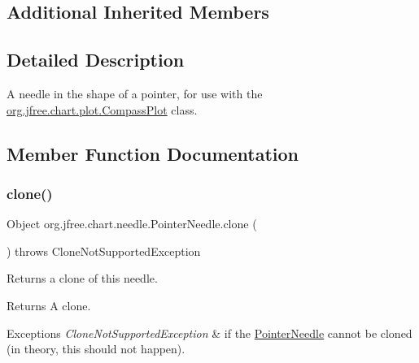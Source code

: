 \subsection*{Additional Inherited Members}


\subsection{Detailed Description}
A needle in the shape of a pointer, for use with the \mbox{\hyperlink{classorg_1_1jfree_1_1chart_1_1plot_1_1_compass_plot}{org.\+jfree.\+chart.\+plot.\+Compass\+Plot}} class. 

\subsection{Member Function Documentation}
\mbox{\label{classorg_1_1jfree_1_1chart_1_1needle_1_1_pointer_needle_ab6eb5f42328f3e753a22d1a4e0b7c352}} 
\subsubsection{\texorpdfstring{clone()}{clone()}}
{\footnotesize\ttfamily Object org.\+jfree.\+chart.\+needle.\+Pointer\+Needle.\+clone (\begin{DoxyParamCaption}{ }\end{DoxyParamCaption}) throws Clone\+Not\+Supported\+Exception}

Returns a clone of this needle.

\begin{DoxyReturn}{Returns}
A clone.
\end{DoxyReturn}

\begin{DoxyExceptions}{Exceptions}
{\em Clone\+Not\+Supported\+Exception} & if the {\ttfamily \mbox{\hyperlink{classorg_1_1jfree_1_1chart_1_1needle_1_1_pointer_needle}{Pointer\+Needle}}} cannot be cloned (in theory, this should not happen). \\
\hline
\end{DoxyExceptions}
\mbox{\label{classorg_1_1jfree_1_1chart_1_1needle_1_1_pointer_needle_a902169adf5137812f304441cbcbff759}} 
